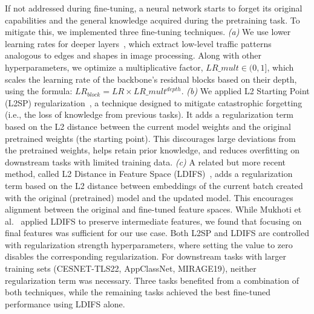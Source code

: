 \documentclass[lettersize,journal,twoside,article]{IEEEtran}
\begin{document}
If not addressed during fine-tuning, a neural network starts to forget its original capabilities and the general knowledge acquired during the pretraining task. To mitigate this, we implemented three fine-tuning techniques. \textit{(a)} We use lower learning rates for deeper layers~\cite{Dong2022_LRdecay}, which extract low-level traffic patterns analogous to edges and shapes in image processing. Along with other hyperparameters, we optimize a multiplicative factor, $LR\_mult \in (0, 1]$, which scales the learning rate of the backbone's residual blocks based on their depth, using the formula: $LR_{block} = LR \times LR\_mult^{depth}$. \textit{(b)} We applied L2 Starting Point (L2SP) regularization~\cite{Li2018_L2SP}, a technique designed to mitigate catastrophic forgetting (i.e., the loss of knowledge from previous tasks). It adds a regularization term based on the L2 distance between the current model weights and the original pretrained weights (the starting point). This discourages large deviations from the pretrained weights, helps retain prior knowledge, and reduces overfitting on downstream tasks with limited training data. \textit{(c)} A related but more recent method, called L2 Distance in Feature Space (LDIFS)~\cite{Mukhoti2024_LDIFS}, adds a regularization term based on the L2 distance between embeddings of the current batch created with the original (pretrained) model and the updated model. This encourages alignment between the original and fine-tuned feature spaces. While Mukhoti et al.~\cite{Mukhoti2024_LDIFS} applied LDIFS to preserve intermediate features, we found that focusing on final features was sufficient for our use case. Both L2SP and LDIFS are controlled with regularization strength hyperparameters, where setting the value to zero disables the corresponding regularization. For downstream tasks with larger training sets (CESNET-TLS22, AppClassNet, MIRAGE19), neither regularization term was necessary. Three tasks benefited from a combination of both techniques, while the remaining tasks achieved the best fine-tuned performance using LDIFS alone.
\end{document}
